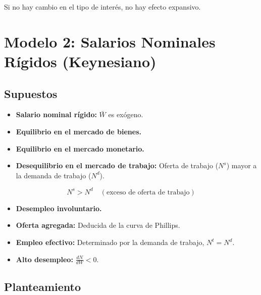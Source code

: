 \documentclass[
  doc,
  floatsintext,
  longtable,
  a4paper,
  nolmodern,
  notxfonts,
  notimes,
  12pt,
  colorlinks=true,linkcolor=blue,citecolor=blue,urlcolor=blue]{apa7}
\providecommand{\tightlist}{%
  \setlength{\itemsep}{0pt}\setlength{\parskip}{0pt}}
\begin{document}


Si no hay cambio en el tipo de interés, no hay efecto expansivo.

\section{Modelo 2: Salarios Nominales Rígidos
(Keynesiano)}\label{modelo-2-salarios-nominales-ruxedgidos-keynesiano}

\subsection{Supuestos}\label{supuestos-1}

\begin{itemize}
\tightlist
\item
  \textbf{Salario nominal rígido:} \(\bar{W}\) es exógeno.
\item
  \textbf{Equilibrio en el mercado de bienes.}
\item
  \textbf{Equilibrio en el mercado monetario.}
\item
  \textbf{Desequilibrio en el mercado de trabajo:} Oferta de trabajo
  (\(N^s\)) mayor a la demanda de trabajo (\(N^d\)).
\end{itemize}

\[
N^s > N^d \quad (\text{exceso de oferta de trabajo})
\]

\begin{itemize}
\tightlist
\item
  \textbf{Desempleo involuntario.}
\item
  \textbf{Oferta agregada:} Deducida de la curva de Phillips.
\item
  \textbf{Empleo efectivo:} Determinado por la demanda de trabajo,
  \(N^t = N^d\).
\item
  \textbf{Alto desempleo:} \(\frac{dN}{dW} < 0\).
\end{itemize}

\subsection{Planteamiento}\label{planteamiento-1}
\end{document}
